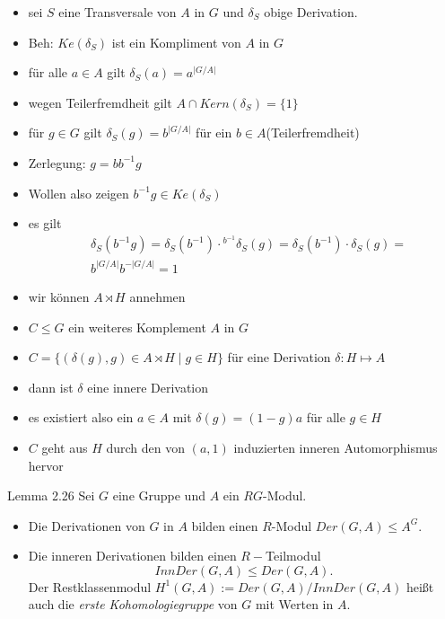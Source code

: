 \documentclass{beamer}
\begin{document}
\begin{frame}
\begin{itemize}
\item sei $S$ eine Transversale von $A$ in $G$ und $\delta_S$ obige Derivation.\pause 
\item Beh: $Ke(\delta_S)$ ist ein Kompliment von $A$ in $G$ \pause 
\item für alle $a\in A$ gilt $\delta_S(a)=a^{\vert G/A\vert }$\pause
\item wegen Teilerfremdheit gilt $A\cap Kern(\delta_S)=\{1\}$\pause 
\item für $g\in G$ gilt $\delta_S(g)=b^{\vert G/A\vert}$ für ein $b\in A$(Teilerfremdheit)\pause 
\item Zerlegung: $g=bb^{-1}g$\pause 
\item Wollen also zeigen $b^{-1}g\in Ke(\delta_S)$
\item es gilt \pause 
\begin{align*}
&\delta_S(b^{-1}g)=\delta_S(b^{-1})\cdot{}^{b^{-1}}\delta_S(g)=\delta_S(b^{-1})\cdot\delta_S(g)=\\
&b^{\vert G/A\vert}b^{-\vert G/A\vert}=1
\end{align*}
\end{itemize}
\end{frame}
\begin{frame}
\begin{itemize}
\item wir können $A\rtimes H$ annehmen \pause
\item $C\leq G$ ein weiteres Komplement $A$ in $G$ \pause 
\item $C=\{(\delta(g),g)\in A\rtimes H\mid g\in H\}$ für eine Derivation $\delta:H\mapsto A$\pause 
\item dann ist $\delta$ eine innere Derivation \pause
\item es existiert also ein $a\in A$ mit $\delta(g)=(1-g)a$ für alle $g\in H$\pause
\item $C$ geht aus $H$ durch den von $(a,1)$ induzierten inneren Automorphismus hervor
\end{itemize}
\end{frame}

\begin{frame}
\begin{block}{Lemma 2.26}
Sei $G$ eine Gruppe und $A$ ein $RG$-Modul.
\begin{itemize}
\item Die Derivationen von $G$ in $A$ bilden einen $R$-Modul $Der(G,A)\leq A^G.$
\item Die inneren Derivationen bilden einen $R-$Teilmodul 
\[
InnDer(G,A)\leq Der(G,A).
\]
Der Restklassenmodul $H^1(G,A):=Der(G,A) /InnDer(G,A)$ heißt auch die \emph{erste Kohomologiegruppe} von $G$ mit Werten in $A.$
\end{itemize}
\end{block}
\end{frame}
\end{document}
